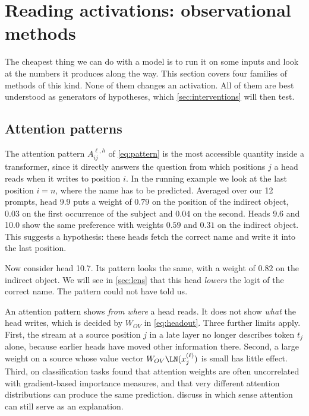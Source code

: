\section{Reading activations: observational methods}
\label{sec:observation}

The cheapest thing we can do with a model is to run it on some inputs and look at the numbers it produces
along the way. This section covers four families of methods of this kind. None of them changes an activation.
All of them are best understood as generators of hypotheses, which \cref{sec:interventions} will then test.

\subsection{Attention patterns}
\label{sec:attention}

The attention pattern $A^{\ell,h}_{ij}$ of \eqref{eq:pattern} is the most accessible quantity inside a
transformer, since it directly answers the question from which positions $j$ a head reads when it writes to
position $i$. In the running example we look at the last position $i=n$, where the name has to be predicted.
Averaged over our 12 prompts, head 9.9 puts a weight of $0.79$ on the position of the indirect object, $0.03$ on
the first occurrence of the subject and $0.04$ on the second. Heads 9.6 and 10.0 show the same preference with
weights $0.59$ and $0.31$ on the indirect object. This suggests a hypothesis: these heads fetch the correct name
and write it into the last position.

Now consider head 10.7. Its pattern looks the same, with a weight of $0.82$ on the indirect object. We will see
in \cref{sec:lens} that this head \emph{lowers} the logit of the correct name. The pattern could not have told
us.

\begin{caution}
An attention pattern shows \emph{from where} a head reads. It does not show \emph{what} the head writes, which is
decided by $W_{OV}$ in \eqref{eq:headout}. Three further limits apply. First, the stream at a source position
$j$ in a late layer no longer describes token $t_j$ alone, because earlier heads have moved other information
there. Second, a large weight on a source whose value vector $W_{OV}\LN(x_j^{(\ell)})$ is small has little effect.
Third, on classification tasks \citet{jain2019attention} found that attention weights are often uncorrelated with
gradient-based importance measures, and that very different attention distributions can produce the same
prediction. \citet{wiegreffe2019attention} discuss in which sense attention can still serve as an explanation.
\end{caution}


